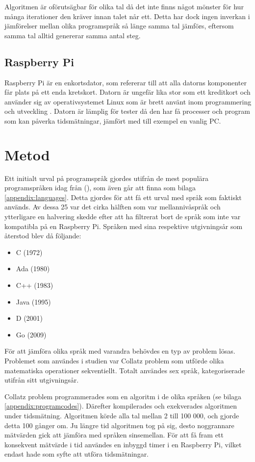 \documentclass[12pt,swedish]{article}
\begin{document}
Algoritmen är oförutsägbar för olika tal då det inte finns något mönster för hur många iterationer den kräver innan talet når ett. Detta har dock ingen inverkan i jämförelser mellan olika programspråk så länge samma tal jämförs, eftersom samma tal alltid genererar samma antal steg.

\subsection{Raspberry Pi}
Raspberry Pi är en enkortsdator, som refererar till att alla datorns komponenter får plats på ett enda kretskort. Datorn är ungefär lika stor som ett kreditkort och använder sig av operativsystemet Linux som är brett använt inom programmering och utveckling \citep{andrews_2013}. Datorn är lämplig för tester då den har få processer och program som kan påverka tidsmätningar, jämfört med till exempel en vanlig PC.


\newpage
\section{Metod}
Ett initialt urval på programspråk gjordes utifrån de mest populära programspråken idag från  (\citeyear{tiobe}), som även går att finna som bilaga \ref{appendix:languages}. Detta gjordes för att få ett urval med språk som faktiskt används. Av dessa 25 var det cirka hälften som var mellannivåspråk och ytterligare en halvering skedde efter att ha filtrerat bort de språk som inte var kompatibla på en Raspberry Pi. Språken med sina respektive utgivningsår som återstod blev då följande:

\begin{itemize}
    \item C (1972)
    \item Ada (1980)
    \item C++ (1983)
    \item Java (1995)
    \item D (2001)
    \item Go (2009)
\end{itemize}
För att jämföra olika språk med varandra behövdes en typ av problem lösas. Problemet som användes i studien var Collatz problem som utförde olika matematiska operationer sekventiellt. Totalt användes sex språk, kategoriserade utifrån sitt utgivningsår.

Collatz problem programmerades som en algoritm i de olika språken (se bilaga \ref{appendix:programcodes}).
Därefter kompilerades och exekverades algoritmen under tidsmätning. Algoritmen körde alla tal mellan 2 till 100 000, och gjorde detta 100 gånger om. Ju längre tid algoritmen tog på sig, desto noggrannare mätvärden gick att jämföra med språken sinsemellan. För att få fram ett konsekvent mätvärde i tid användes en inbyggd timer i en Raspberry Pi, vilket endast hade som syfte att utföra tidsmätningar.
\end{document}
